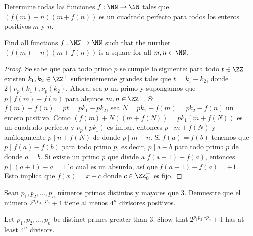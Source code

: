 \begin{probEG}
  Determine todas las funciones $f:\NN\to\NN$ tales que $(f(m)+n)(m+f(n))$ es un
  cuadrado perfecto para todos los enteros positivos $m$ y $n$.
  \begin{hint}
    Find all functions $f:\NN\to\NN$ such that the number $(f(m)+n)(m+f(n))$ is
    a square for all $m,n\in\NN$.
  \end{hint}
\end{probEG}

\begin{proof}
  Se sabe que para todo primo $p$ se cumple lo siguiente: para todo $t\in\ZZ$
  existen $k_1,k_2\in\ZZ^+$ suficientemente grandes tales que $t=k_1-k_2$, donde
  $2\mid\nu_p(k_1),\nu_p(k_2)$. Ahora, sea $p$ un primo y supongamos que
  $p\mid f(m)-f(n)$ para algunos $m,n\in\ZZ^+$. Si $f(m)-f(n)=pt=pk_1-pk_2$, sea
  $N=pk_1-f(m)=pk_2-f(n)$ un entero positivo. Como
  $(f(m)+N)(m+f(N))=pk_1(m+f(N))$ es un cuadrado perfecto y $\nu_p(pk_1)$ es
  impar, entonces $p\mid m+f(N)$ y análogamente $p\mid n+f(N)$ de donde
  $p\mid m-n$. Si $f(a)=f(b)$ tenemos que $p\mid f(a)-f(b)$ para todo primo $p$,
  es decir, $p\mid a-b$ para todo primo $p$ de donde $a=b$. Si existe un primo
  $p$ que divide a $f(a+1)-f(a)$, entonces $p\mid (a+1)-a=1$ lo cual es un
  absurdo, así que $f(a+1)-f(a)=\pm 1$. Esto implica que $f(x)=x+c$ donde
  $c\in\ZZ^+_0$ es fijo.
\end{proof}

\begin{probEG}[ISL 2002/N3]
  Sean $p_1,p_2,\dots,p_n$ números primos distintos y mayores que $3$. Demuestre
  que el número $2^{p_1p_2\cdots p_n}+1$ tiene al menos $4^n$ divisores
  positivos.
  \begin{hint}
    Let $p_1,p_2,\dots,p_n$ be distinct primes greater than $3$. Show that
    $2^{p_1p_2\cdots p_n}+1$ has at least $4^n$ divisors.
  \end{hint}
\end{probEG}

